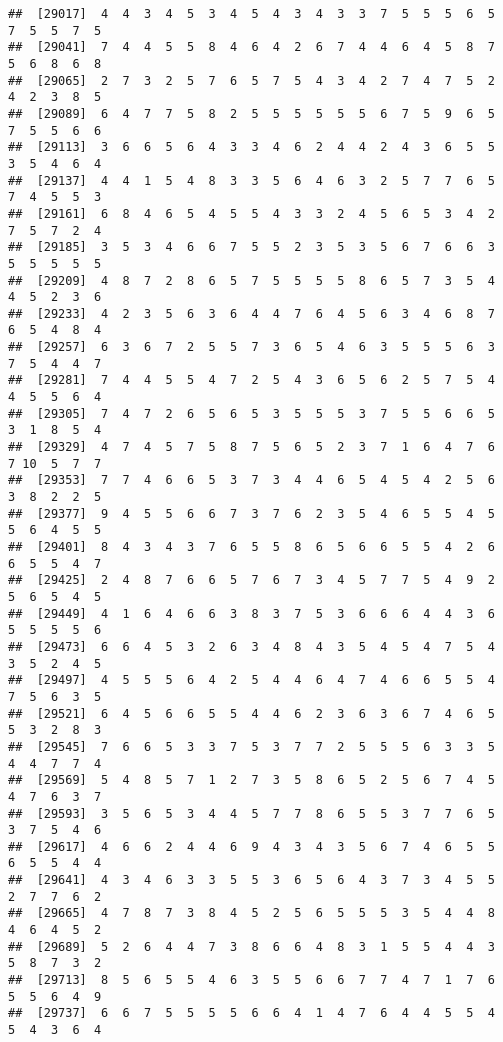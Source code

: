 \documentclass[
]{book}
\begin{document}
\begin{verbatim}
##  [29017]  4  4  3  4  5  3  4  5  4  3  4  3  3  7  5  5  5  6  5  7  5  5  7  5
##  [29041]  7  4  4  5  5  8  4  6  4  2  6  7  4  4  6  4  5  8  7  5  6  8  6  8
##  [29065]  2  7  3  2  5  7  6  5  7  5  4  3  4  2  7  4  7  5  2  4  2  3  8  5
##  [29089]  6  4  7  7  5  8  2  5  5  5  5  5  5  6  7  5  9  6  5  7  5  5  6  6
##  [29113]  3  6  6  5  6  4  3  3  4  6  2  4  4  2  4  3  6  5  5  3  5  4  6  4
##  [29137]  4  4  1  5  4  8  3  3  5  6  4  6  3  2  5  7  7  6  5  7  4  5  5  3
##  [29161]  6  8  4  6  5  4  5  5  4  3  3  2  4  5  6  5  3  4  2  7  5  7  2  4
##  [29185]  3  5  3  4  6  6  7  5  5  2  3  5  3  5  6  7  6  6  3  5  5  5  5  5
##  [29209]  4  8  7  2  8  6  5  7  5  5  5  5  8  6  5  7  3  5  4  4  5  2  3  6
##  [29233]  4  2  3  5  6  3  6  4  4  7  6  4  5  6  3  4  6  8  7  6  5  4  8  4
##  [29257]  6  3  6  7  2  5  5  7  3  6  5  4  6  3  5  5  5  6  3  7  5  4  4  7
##  [29281]  7  4  4  5  5  4  7  2  5  4  3  6  5  6  2  5  7  5  4  4  5  5  6  4
##  [29305]  7  4  7  2  6  5  6  5  3  5  5  5  3  7  5  5  6  6  5  3  1  8  5  4
##  [29329]  4  7  4  5  7  5  8  7  5  6  5  2  3  7  1  6  4  7  6  7 10  5  7  7
##  [29353]  7  7  4  6  6  5  3  7  3  4  4  6  5  4  5  4  2  5  6  3  8  2  2  5
##  [29377]  9  4  5  5  6  6  7  3  7  6  2  3  5  4  6  5  5  4  5  5  6  4  5  5
##  [29401]  8  4  3  4  3  7  6  5  5  8  6  5  6  6  5  5  4  2  6  6  5  5  4  7
##  [29425]  2  4  8  7  6  6  5  7  6  7  3  4  5  7  7  5  4  9  2  5  6  5  4  5
##  [29449]  4  1  6  4  6  6  3  8  3  7  5  3  6  6  6  4  4  3  6  5  5  5  5  6
##  [29473]  6  6  4  5  3  2  6  3  4  8  4  3  5  4  5  4  7  5  4  3  5  2  4  5
##  [29497]  4  5  5  5  6  4  2  5  4  4  6  4  7  4  6  6  5  5  4  7  5  6  3  5
##  [29521]  6  4  5  6  6  5  5  4  4  6  2  3  6  3  6  7  4  6  5  5  3  2  8  3
##  [29545]  7  6  6  5  3  3  7  5  3  7  7  2  5  5  5  6  3  3  5  4  4  7  7  4
##  [29569]  5  4  8  5  7  1  2  7  3  5  8  6  5  2  5  6  7  4  5  4  7  6  3  7
##  [29593]  3  5  6  5  3  4  4  5  7  7  8  6  5  5  3  7  7  6  5  3  7  5  4  6
##  [29617]  4  6  6  2  4  4  6  9  4  3  4  3  5  6  7  4  6  5  5  6  5  5  4  4
##  [29641]  4  3  4  6  3  3  5  5  3  6  5  6  4  3  7  3  4  5  5  2  7  7  6  2
##  [29665]  4  7  8  7  3  8  4  5  2  5  6  5  5  5  3  5  4  4  8  4  6  4  5  2
##  [29689]  5  2  6  4  4  7  3  8  6  6  4  8  3  1  5  5  4  4  3  5  8  7  3  2
##  [29713]  8  5  6  5  5  4  6  3  5  5  6  6  7  7  4  7  1  7  6  5  5  6  4  9
##  [29737]  6  6  7  5  5  5  5  6  6  4  1  4  7  6  4  4  5  5  4  5  4  3  6  4

\end{verbatim}
\end{document}

